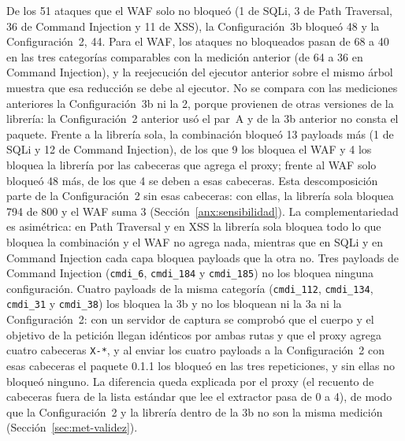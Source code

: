 De los 51 ataques que el WAF solo no bloqueó (1 de SQLi, 3 de Path Traversal, 36 de Command
Injection y 11 de XSS), la Configuración~3b bloqueó 48 y la Configuración~2, 44. Para el WAF, los
ataques no bloqueados pasan de 68 a 40 en las tres categorías comparables con la medición anterior
(de 64 a 36 en Command Injection), y la reejecución del ejecutor anterior sobre el mismo árbol
muestra que esa reducción se debe al ejecutor. No se compara con las mediciones anteriores la
Configuración~3b ni la 2, porque provienen de otras versiones de la librería: la Configuración~2
anterior usó el par~A y de la 3b anterior no consta el paquete. Frente a la librería sola, la combinación bloqueó 13 payloads más (1 de SQLi y 12 de
Command Injection), de los que 9 los bloquea el WAF y 4 los bloquea la librería por las cabeceras
que agrega el proxy; frente al WAF solo bloqueó 48 más, de los que 4 se deben a esas cabeceras. Esta
descomposición parte de la Configuración~2 sin esas cabeceras: con ellas, la librería sola bloquea
794 de 800 y el WAF suma 3 (Sección~\ref{anx:sensibilidad}). La complementariedad es asimétrica: en Path
Traversal y en XSS la librería sola bloquea todo lo que bloquea la combinación y el WAF no agrega
nada, mientras que en SQLi y en Command Injection cada capa bloquea payloads que la otra no. Tres
payloads de Command Injection (\texttt{cmdi\_6}, \texttt{cmdi\_184} y \texttt{cmdi\_185}) no los
bloquea ninguna configuración. Cuatro payloads de la misma categoría (\texttt{cmdi\_112},
\texttt{cmdi\_134}, \texttt{cmdi\_31} y \texttt{cmdi\_38}) los bloquea la 3b y no los bloquean ni la
3a ni la Configuración~2: con un servidor de captura se comprobó que el cuerpo y el objetivo de la
petición llegan idénticos por ambas rutas y que el proxy agrega cuatro cabeceras \texttt{X-*}, y al
enviar los cuatro payloads a la Configuración~2 con esas cabeceras el paquete 0.1.1 los bloqueó en
las tres repeticiones, y sin ellas no bloqueó ninguno. La diferencia queda explicada por el proxy
(el recuento de cabeceras fuera de la lista estándar que lee el extractor pasa de 0 a 4), de modo
que la Configuración~2 y la librería dentro de la 3b no son la misma medición
(Sección~\ref{sec:met-validez}).

